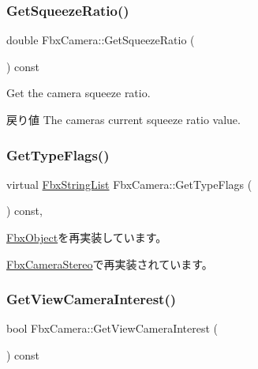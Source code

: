 \subsubsection{\texorpdfstring{Get\+Squeeze\+Ratio()}{GetSqueezeRatio()}}
{\footnotesize\ttfamily double Fbx\+Camera\+::\+Get\+Squeeze\+Ratio (\begin{DoxyParamCaption}{ }\end{DoxyParamCaption}) const}

Get the camera squeeze ratio. \begin{DoxyReturn}{戻り値}
The camera\textquotesingle{}s current squeeze ratio value. 
\end{DoxyReturn}
\mbox{\label{class_fbx_camera_ac52d0e82cbabac69f8b0dcd212853616}} 
\subsubsection{\texorpdfstring{Get\+Type\+Flags()}{GetTypeFlags()}}
{\footnotesize\ttfamily virtual \hyperlink{class_fbx_string_list}{Fbx\+String\+List} Fbx\+Camera\+::\+Get\+Type\+Flags (\begin{DoxyParamCaption}{ }\end{DoxyParamCaption}) const\hspace{0.3cm}{\ttfamily [protected]}, {\ttfamily [virtual]}}



\hyperlink{class_fbx_object_a6d30a5d00400039a248977cf9f9255b2}{Fbx\+Object}を再実装しています。



\hyperlink{class_fbx_camera_stereo_a73c9df71edcd9a56b2710357b95fcde6}{Fbx\+Camera\+Stereo}で再実装されています。

\mbox{\label{class_fbx_camera_a37fccd3efdcbde412e147c42bd08af0a}} 
\subsubsection{\texorpdfstring{Get\+View\+Camera\+Interest()}{GetViewCameraInterest()}}
{\footnotesize\ttfamily bool Fbx\+Camera\+::\+Get\+View\+Camera\+Interest (\begin{DoxyParamCaption}{ }\end{DoxyParamCaption}) const}

